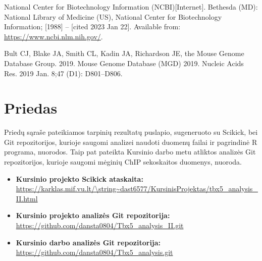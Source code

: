 \documentclass[12pt]{article}
\begin{document}
\begin{thebibliography}{99}
 National Center for Biotechnology Information (NCBI)[Internet].
Bethesda (MD): National Library of Medicine (US), National Center for
Biotechnology Information; [1988] – [cited 2023 Jan 22]. Available from:
\url{https://www.ncbi.nlm.nih.gov/}.

 Bult CJ, Blake JA, Smith CL, Kadin JA, Richardson JE, the
Mouse Genome Database Group. 2019. Mouse Genome Database (MGD) 2019.
Nucleic Acids Res. 2019 Jan. 8;47 (D1): D801–D806.

\end{thebibliography}

\newpage


\section{Priedas} \label{Priedas}
Priedų sąraše pateikiamos tarpinių rezultatų puslapio, sugeneruoto su Scikick,
bei Git re\-po\-zi\-to\-ri\-jos, kurioje saugomi analizei naudoti duomenų
failai ir pagrindinė R programa, nuorodos. Taip pat pateikta Kursinio darbo metu
atliktos analizės Git repozitorijos, kurioje saugomi mėginių ChIP sekoskaitos
duomenys, nuoroda.

\begin{itemize}
    \item \textbf{Kursinio projekto Scikick ataskaita:}\\
          \url{https://karklas.mif.vu.lt/\string~dast6577/KursinisProjektas/tbx5\_analysis\_II.html}
    \item \textbf{Kursinio projekto analizės Git repozitorija:}\\
          \url{https://github.com/dansta0804/Tbx5\_analysis\_II.git}
    \item \textbf{Kursinio darbo analizės Git repozitorija:}\\
          \url{https://github.com/dansta0804/Tbx5\_analysis.git}
  \end{itemize}
\end{document}
